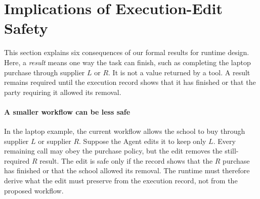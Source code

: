 \section{Implications of Execution-Edit Safety}
\label{sec:implications}

This section explains six consequences of our formal results for runtime design.
Here, a \emph{result} means one way the task can finish, such as completing the laptop purchase through supplier \(L\) or \(R\).
It is not a value returned by a tool.
A result remains required until the execution record shows that it has finished or that the party requiring it allowed its removal.

\paragraph{A smaller workflow can be less safe}
In the laptop example, the current workflow allows the school to buy through supplier \(L\) or supplier \(R\).
Suppose the Agent edits it to keep only \(L\).
Every remaining call may obey the purchase policy, but the edit removes the still-required \(R\) result.
The edit is safe only if the record shows that the \(R\) purchase has finished or that the school allowed its removal.
The runtime must therefore derive what the edit must preserve from the execution record, not from the proposed workflow.

